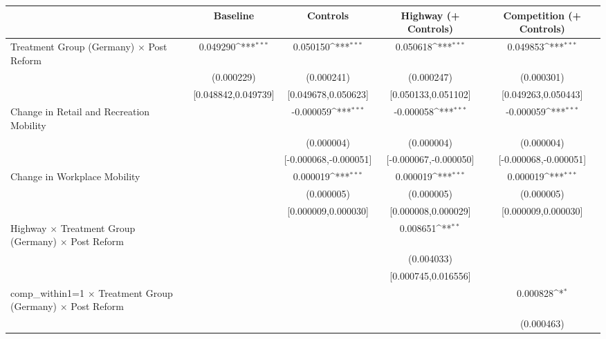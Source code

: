 {
\def\sym#1{\ifmmode^{#1}\else\(^{#1}\)\fi}
\begin{tabular}{l*{4}{c}}
\toprule
                    &\multicolumn{1}{c}{Baseline}&\multicolumn{1}{c}{Controls}&\multicolumn{1}{c}{Highway (+ Controls)}&\multicolumn{1}{c}{Competition (+ Controls)}\\
\midrule
Treatment Group (Germany) $\times$ Post Reform&    0.049290\sym{***}&    0.050150\sym{***}&    0.050618\sym{***}&    0.049853\sym{***}\\
                    &  (0.000229)         &  (0.000241)         &  (0.000247)         &  (0.000301)         \\
                    &[0.048842,0.049739]         &[0.049678,0.050623]         &[0.050133,0.051102]         &[0.049263,0.050443]         \\
Change in Retail and Recreation Mobility&                     &   -0.000059\sym{***}&   -0.000058\sym{***}&   -0.000059\sym{***}\\
                    &                     &  (0.000004)         &  (0.000004)         &  (0.000004)         \\
                    &                     &[-0.000068,-0.000051]         &[-0.000067,-0.000050]         &[-0.000068,-0.000051]         \\
Change in Workplace Mobility&                     &    0.000019\sym{***}&    0.000019\sym{***}&    0.000019\sym{***}\\
                    &                     &  (0.000005)         &  (0.000005)         &  (0.000005)         \\
                    &                     &[0.000009,0.000030]         &[0.000008,0.000029]         &[0.000009,0.000030]         \\
Highway $\times$ Treatment Group (Germany) $\times$ Post Reform&                     &                     &    0.008651\sym{**} &                     \\
                    &                     &                     &  (0.004033)         &                     \\
                    &                     &                     &[0.000745,0.016556]         &                     \\
comp\_within1=1 $\times$ Treatment Group (Germany) $\times$ Post Reform&                     &                     &                     &    0.000828\sym{*}  \\
                    &                     &                     &                     &  (0.000463)         \\

\end{tabular}}
